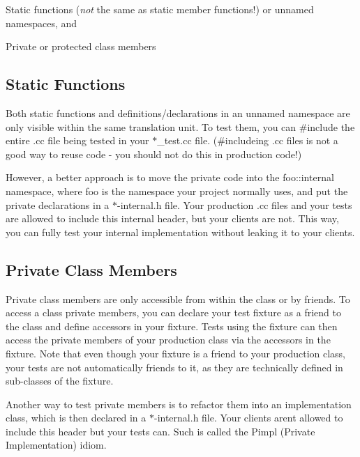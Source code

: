 \begin{DoxyItemize}
\item Static functions ({\itshape not} the same as static member functions!) or unnamed namespaces, and
\item Private or protected class members
\end{DoxyItemize}

\subsection*{Static Functions}

Both static functions and definitions/declarations in an unnamed namespace are only visible within the same translation unit. To test them, you can {\ttfamily \#include} the entire {\ttfamily .cc} file being tested in your {\ttfamily $\ast$\+\_\+test.cc} file. ({\ttfamily \#include}ing {\ttfamily .cc} files is not a good way to reuse code -\/ you should not do this in production code!)

However, a better approach is to move the private code into the {\ttfamily foo\+::internal} namespace, where {\ttfamily foo} is the namespace your project normally uses, and put the private declarations in a {\ttfamily $\ast$-\/internal.h} file. Your production {\ttfamily .cc} files and your tests are allowed to include this internal header, but your clients are not. This way, you can fully test your internal implementation without leaking it to your clients.

\subsection*{Private Class Members}

Private class members are only accessible from within the class or by friends. To access a class\textquotesingle{} private members, you can declare your test fixture as a friend to the class and define accessors in your fixture. Tests using the fixture can then access the private members of your production class via the accessors in the fixture. Note that even though your fixture is a friend to your production class, your tests are not automatically friends to it, as they are technically defined in sub-\/classes of the fixture.

Another way to test private members is to refactor them into an implementation class, which is then declared in a {\ttfamily $\ast$-\/internal.h} file. Your clients aren\textquotesingle{}t allowed to include this header but your tests can. Such is called the Pimpl (Private Implementation) idiom.


